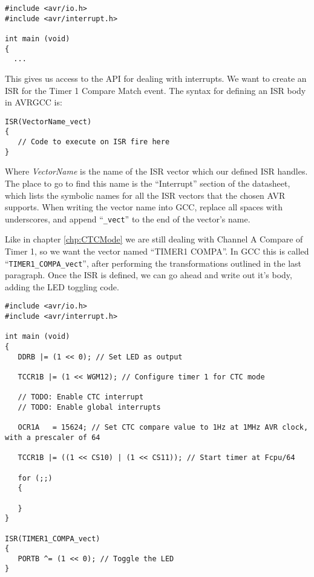 \documentclass[a4paper,oneside]{book}
\begin{document}
\begin{center}
\begin{lstlisting}
#include <avr/io.h>
#include <avr/interrupt.h>

int main (void)
{
  ...
\end{lstlisting}
\end{center}

This gives us access to the API for dealing with interrupts. We want to create an ISR for the Timer 1 Compare Match event. The syntax for defining an ISR body in AVRGCC is:

\begin{center}
\begin{lstlisting}
ISR(VectorName_vect)
{
   // Code to execute on ISR fire here
} 
\end{lstlisting}
\end{center}

Where \emph{VectorName} is the name of the ISR vector which our defined ISR handles. The place to go to find this name is the ``Interrupt'' section of the datasheet, which lists the symbolic names for all the ISR vectors that the chosen AVR supports. When writing the vector name into GCC, replace all spaces with underscores, and append ``\texttt{\_vect}'' to the end of the vector's name.

Like in chapter \ref{chp:CTCMode} we are still dealing with Channel A Compare of Timer 1, so we want the vector named ``TIMER1 COMPA''. In GCC this is called ``\texttt{TIMER1\_COMPA\_vect}'', after performing the transformations outlined in the last paragraph. Once the ISR is defined, we can go ahead and write out it's body, adding the LED toggling code.

\begin{center}
\begin{lstlisting}
#include <avr/io.h>
#include <avr/interrupt.h>

int main (void)
{
   DDRB |= (1 << 0); // Set LED as output

   TCCR1B |= (1 << WGM12); // Configure timer 1 for CTC mode

   // TODO: Enable CTC interrupt
   // TODO: Enable global interrupts

   OCR1A   = 15624; // Set CTC compare value to 1Hz at 1MHz AVR clock, with a prescaler of 64

   TCCR1B |= ((1 << CS10) | (1 << CS11)); // Start timer at Fcpu/64

   for (;;)
   {

   }
}

ISR(TIMER1_COMPA_vect)
{
   PORTB ^= (1 << 0); // Toggle the LED
} 
\end{lstlisting}
\end{center}
\end{document}
